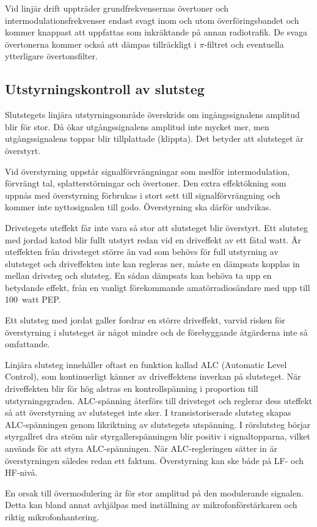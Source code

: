 Vid linjär drift uppträder grundfrekvensernas övertoner och
intermodulationsfrekvenser endast svagt inom och utom
överföringsbandet och kommer knappast att uppfattas som inkräktande på
annan radiotrafik.
De svaga övertonerna kommer också att dämpas tillräckligt i \(\pi \)-filtret
och eventuella ytterligare övertonsfilter.


\subsection{Utstyrningskontroll av slutsteg}
\label{förstärkare_utstyrningskontroll}

Slutstegets linjära utstyrningsområde överskrids om ingångssignalens
amplitud blir för stor.
Då ökar utgångssignalens amplitud inte mycket mer, men utgångssignalens toppar
blir tillplattade (klippta).
Det betyder att slutsteget är överstyrt.

Vid överstyrning uppstår signalförvrängningar som medför intermodulation,
förvrängt tal, splatterstörningar och övertoner.
Den extra effektökning som uppnås med överstyrning förbrukas i stort sett
till signalförvrängning och kommer inte nyttosignalen till godo.
Överstyrning ska därför undvikas.

Drivstegets uteffekt får inte vara så stor att slutsteget blir överstyrt.
Ett slutsteg med jordad katod blir fullt utstyrt redan vid en driveffekt av ett
fåtal watt.
Är uteffekten från drivsteget större än vad som behövs för full utstyrning av
slutsteget och driveffekten inte kan regleras ner, måste en dämpsats
kopplas in mellan drivsteg och slutsteg.
En sådan dämpsats kan behöva ta upp en betydande effekt, från en vanligt
förekommande amatörradiosändare med upp till 100~watt PEP.

Ett slutsteg med jordat galler fordrar en större driveffekt, varvid
risken för överstyrning i slutsteget är något mindre och de
förebyggande åtgärderna inte så omfattande.

Linjära slutsteg innehåller oftast en funktion kallad ALC (Automatic Level
Control), som kontinuerligt känner av driveffektens inverkan på slutsteget.
När driveffekten blir för hög alstras en kontrollspänning i proportion till
utstyrningsgraden.
ALC-spänning återförs till drivsteget och reglerar dess uteffekt så att
överstyrning av slutsteget inte sker.
I transistoriserade slutsteg skapas ALC-spänningen genom likriktning av
slutstegets utspänning.
I rörslutsteg börjar styrgallret dra ström när styrgallerspänningen
blir positiv i signaltopparna, vilket används för att styra ALC-spänningen.
När ALC-regleringen sätter in är överstyrningen således redan ett faktum.
Överstyrning kan ske både på LF- och HF-nivå.

En orsak till övermodulering är för stor amplitud på den modulerande signalen.
Detta kan bland annat avhjälpas med inställning av mikrofonförstärkaren och
riktig mikrofonhantering.
